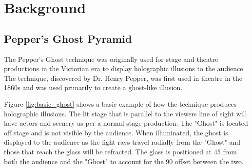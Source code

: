 \section{Background}
\subsection{Pepper's Ghost Pyramid}

The Pepper's Ghost technique was originally used for stage and theatre productions in the Victorian era to display holographic illusions to the audience. The technique, discovered by Dr. Henry Pepper, was first used in theatre in the 1860s\cite{pepper_ghost_comsol} and was used primarily to create a ghost-like illusion.

\begin{figure}[h!]
\end{figure}

Figure \ref{fig:basic_ghost} shows a basic example of how the technique produces holographic illusions. The lit stage that is parallel to the viewers line of sight will have actors and scenery as per a normal stage production. The "Ghost" is located off stage and is not visible by the audience. When illuminated, the ghost is displayed to the audience as the light rays travel radially from the "Ghost" and those that reach the glass will be refracted. The glass is positioned at 45\textdegree{} from both the audience and the "Ghost" to account for the 90\textdegree{} offset between the two.

